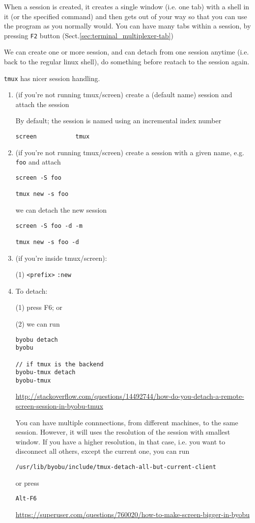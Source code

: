 When a session is created, it creates a single window (i.e. one tab) with a
shell in it (or the specified command) and then gets out of your way so that you can use the program
as you normally would. You can have many tabs within a session, by pressing
\verb!F2! button (Sect.\ref{sec:terminal_multiplexer-tab})

We can create one or more session, and can detach from one session anytime
(i.e. back to the regular linux shell), do something before reatach to the
session again.

\verb!tmux! has nicer session handling. 
\begin{enumerate}
  \item (if you're not running tmux/screen) create a (default name) session and
  attach the session

By default; the session is named using an incremental index number
\begin{verbatim}
screen           tmux
\end{verbatim}

  \item (if you're not running tmux/screen) create a session with a given name,
  e.g. \verb!foo! and attach
\begin{verbatim}
screen -S foo

tmux new -s foo
\end{verbatim}

we can detach the new session
\begin{verbatim}
screen -S foo -d -m

tmux new -s foo -d
\end{verbatim}
  
  \item (if you're inside tmux/screen):
  
  (1) \verb!<prefix>! \verb!:new!
     
  \item To detach: 
  
  (1) press F6; or 
  
  (2) we can run
\begin{verbatim}
byobu detach
byobu

// if tmux is the backend
byobu-tmux detach
byobu-tmux
\end{verbatim}
\url{http://stackoverflow.com/questions/14492744/how-do-you-detach-a-remote-screen-session-in-byobu-tmux}
 
You can have multiple connnections, from different machines, to the same
session. However, it will uses the resolution of the session with smallest
window. If you have a higher resolution, in that case, i.e. you want to
disconnect all others, except the current one, you can run
\begin{verbatim}
/usr/lib/byobu/include/tmux-detach-all-but-current-client
\end{verbatim}
or press
\begin{verbatim}
Alt-F6
\end{verbatim}
\url{https://superuser.com/questions/760020/how-to-make-screen-bigger-in-byobu}
 

\end{enumerate}
